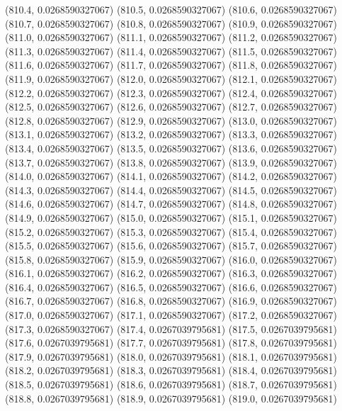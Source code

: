 {					(810.4, 0.0268590327067)
					(810.5, 0.0268590327067)
					(810.6, 0.0268590327067)
					(810.7, 0.0268590327067)
					(810.8, 0.0268590327067)
					(810.9, 0.0268590327067)
					(811.0, 0.0268590327067)
					(811.1, 0.0268590327067)
					(811.2, 0.0268590327067)
					(811.3, 0.0268590327067)
					(811.4, 0.0268590327067)
					(811.5, 0.0268590327067)
					(811.6, 0.0268590327067)
					(811.7, 0.0268590327067)
					(811.8, 0.0268590327067)
					(811.9, 0.0268590327067)
					(812.0, 0.0268590327067)
					(812.1, 0.0268590327067)
					(812.2, 0.0268590327067)
					(812.3, 0.0268590327067)
					(812.4, 0.0268590327067)
					(812.5, 0.0268590327067)
					(812.6, 0.0268590327067)
					(812.7, 0.0268590327067)
					(812.8, 0.0268590327067)
					(812.9, 0.0268590327067)
					(813.0, 0.0268590327067)
					(813.1, 0.0268590327067)
					(813.2, 0.0268590327067)
					(813.3, 0.0268590327067)
					(813.4, 0.0268590327067)
					(813.5, 0.0268590327067)
					(813.6, 0.0268590327067)
					(813.7, 0.0268590327067)
					(813.8, 0.0268590327067)
					(813.9, 0.0268590327067)
					(814.0, 0.0268590327067)
					(814.1, 0.0268590327067)
					(814.2, 0.0268590327067)
					(814.3, 0.0268590327067)
					(814.4, 0.0268590327067)
					(814.5, 0.0268590327067)
					(814.6, 0.0268590327067)
					(814.7, 0.0268590327067)
					(814.8, 0.0268590327067)
					(814.9, 0.0268590327067)
					(815.0, 0.0268590327067)
					(815.1, 0.0268590327067)
					(815.2, 0.0268590327067)
					(815.3, 0.0268590327067)
					(815.4, 0.0268590327067)
					(815.5, 0.0268590327067)
					(815.6, 0.0268590327067)
					(815.7, 0.0268590327067)
					(815.8, 0.0268590327067)
					(815.9, 0.0268590327067)
					(816.0, 0.0268590327067)
					(816.1, 0.0268590327067)
					(816.2, 0.0268590327067)
					(816.3, 0.0268590327067)
					(816.4, 0.0268590327067)
					(816.5, 0.0268590327067)
					(816.6, 0.0268590327067)
					(816.7, 0.0268590327067)
					(816.8, 0.0268590327067)
					(816.9, 0.0268590327067)
					(817.0, 0.0268590327067)
					(817.1, 0.0268590327067)
					(817.2, 0.0268590327067)
					(817.3, 0.0268590327067)
					(817.4, 0.0267039795681)
					(817.5, 0.0267039795681)
					(817.6, 0.0267039795681)
					(817.7, 0.0267039795681)
					(817.8, 0.0267039795681)
					(817.9, 0.0267039795681)
					(818.0, 0.0267039795681)
					(818.1, 0.0267039795681)
					(818.2, 0.0267039795681)
					(818.3, 0.0267039795681)
					(818.4, 0.0267039795681)
					(818.5, 0.0267039795681)
					(818.6, 0.0267039795681)
					(818.7, 0.0267039795681)
					(818.8, 0.0267039795681)
					(818.9, 0.0267039795681)
					(819.0, 0.0267039795681)
}

